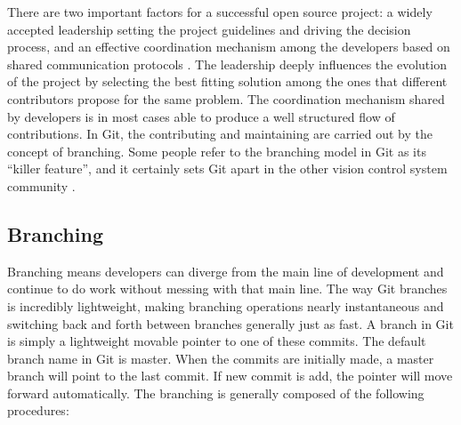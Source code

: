 \documentclass[draftclsnofoot,journal,onecolumn,12pt]{IEEEtran}
\begin{document}
There are two important factors for a successful open source project: a widely accepted leadership setting the project guidelines and driving the decision process, and an effective coordination mechanism among the developers based on shared communication protocols \cite{Bonaccorsi20031243}. The leadership deeply influences the evolution of the project by selecting the best fitting solution among the ones that different contributors propose for the same problem. The coordination mechanism shared by developers is in most cases able to produce a well structured flow of contributions. In Git, the contributing and maintaining are carried out by the concept of branching. Some people refer to the branching model in Git as its “killer feature”, and it certainly sets Git apart in the other vision control system community \cite{chacon2009pro}.

\subsection{Branching}
Branching means developers can diverge from the main line of development and continue to do work without messing with that main line. The way Git branches is incredibly lightweight, making branching operations nearly instantaneous and switching back and forth between branches generally just as fast. A branch in Git is simply a lightweight movable pointer to one of these commits. The default branch name in Git is master. When the commits are initially made, a master branch will point to the last commit. If new commit is add, the pointer will move forward automatically. The branching is generally composed of the following procedures:
\end{document}
